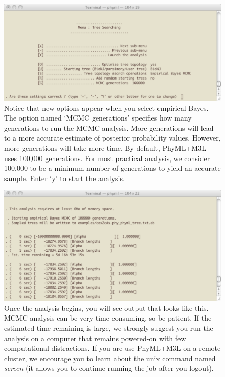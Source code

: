 \documentclass[11pt]{article}
\begin{document}
\begin{figure}[p]
\centering
\includegraphics[width=5.5 in]{GRAPHICS/b4.pdf}
\caption{Notice that new options appear when you select empirical Bayes.  The option named `MCMC generations' specifies how many generations to run the MCMC analysis.  More generations will lead to a more accurate estimate of posterior probability values.  However, more generations will take more time.  By default, PhyML+M3L uses 100,000 generations.  For most practical analysis, we consider 100,000 to be a minimum number of generations to yield an accurate sample.  Enter `y' to start the analysis.}
\end{figure}
\clearpage

\begin{figure}[p]
\centering
\includegraphics[width=5.5 in]{GRAPHICS/b5.pdf}
\caption{Once the analysis begins, you will see output that looks like this.  MCMC analysis can be very time consuming, so be patient.  If the estimated time remaining is large, we strongly suggest you run the analysis on a computer that remains powered-on with few computational distractions.  If  you are use PhyML+M3L on a remote cluster, we encourage you to learn about the unix command named \textit{screen} (it allows you to continue running the job after you logout).}
\end{figure}
\clearpage
\end{document}
